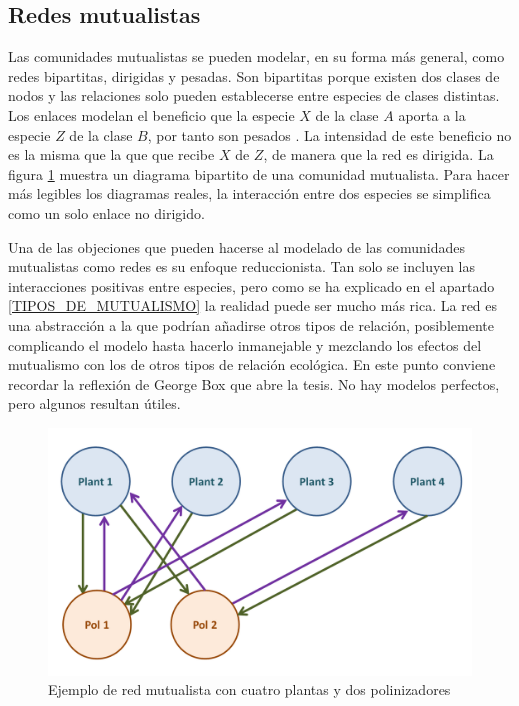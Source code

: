 \subsection{Redes mutualistas}

Las comunidades mutualistas se pueden modelar, en su forma más general, como redes bipartitas, dirigidas y pesadas. Son bipartitas porque existen dos clases de nodos y las relaciones solo pueden establecerse entre especies de clases distintas. Los enlaces modelan el beneficio que la especie $X$ de la clase $A$ aporta a la especie $Z$ de la clase $B$, por tanto son pesados \cite{barrat2004architecture}. La intensidad de este beneficio no es la misma que la que que recibe $X$ de $Z$, de manera que la red es dirigida. La figura \ref{fig:INTRO_bip_ficticia} muestra un diagrama bipartito de una comunidad mutualista. Para hacer más legibles los diagramas reales, la interacción entre dos especies se simplifica como un solo enlace no dirigido.

Una de las objeciones que pueden hacerse al modelado de las comunidades mutualistas como redes es su enfoque reduccionista. Tan solo se incluyen las interacciones positivas entre especies, pero como se ha explicado en el apartado \ref{TIPOS_DE_MUTUALISMO} la realidad puede ser mucho más rica. La red es una abstracción a la que podrían añadirse otros tipos de relación, posiblemente complicando el modelo hasta hacerlo inmanejable y mezclando los efectos del mutualismo con los de otros tipos de relación ecológica. En este punto conviene recordar la reflexión de George Box que abre la tesis. No hay modelos perfectos, pero algunos resultan útiles. 

\begin{figure}[h!]
\centering
\includegraphics[scale=0.4]{Figures/INTRO_bip_ficticia.png}
\caption{Ejemplo de red mutualista con cuatro plantas y dos polinizadores}
\label{fig:INTRO_bip_ficticia}
\end{figure}

